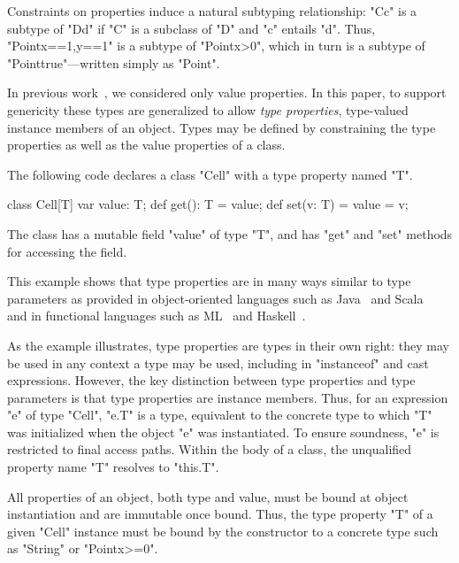 
Constraints on properties induce a natural subtyping relationship:
\xcd"C{c}" is a subtype of
\xcd"D{d}" if \xcd"C" is a subclass of \xcd"D" and
\xcd"c" entails \xcd"d".  Thus, \xcd"Point{x==1,y==1}"
is a subtype of \xcd"Point{x>0}", which in turn is a subtype of
\xcd"Point{true}"---written simply as \xcd"Point".

In previous
work~\cite{X10,constrained-types}, we considered
only value properties.
In this paper,
to support genericity these types are generalized
to allow \emph{type properties}, type-valued instance
members of an object.
Types may be defined by constraining the type properties as
well as the value properties of a class.

The following code declares a class \xcd"Cell" with a type
property named \xcd"T".
\begin{xten}
class Cell[T] {
    var value: T;
    def get(): T = value;
    def set(v: T) = { value = v; }
}
\end{xten}
The class has a mutable field \xcd"value" of type \xcd"T",
and has \xcd"get" and \xcd"set" methods for accessing the field.

This example shows that type properties are in many ways similar to
type parameters as provided in object-oriented languages such as
Java~\cite{Java3} and Scala~\cite{scala} and in functional
languages such as ML~\cite{ml} and
Haskell~\cite{haskell}.

As the example illustrates,
type properties are types in their own right:
they may be used in any context a type may be used,
including in \xcd"instanceof" and cast expressions.
%
However, the key distinction between type properties
and type parameters is that type properties are instance
members.
Thus, for an expression \xcd"e" of type \xcd"Cell", \xcd"e.T" is
a type, equivalent to the concrete type to which \xcd"T" was
initialized when the object \xcd"e" was instantiated.
To ensure
soundness, \xcd"e" is restricted to final access paths.
Within the body of a class, the unqualified property name \xcd"T" resolves
to \xcd"this.T".

All properties of an object, both type and value, must be bound at object
instantiation and are immutable once bound.  Thus, the type
property \xcd"T" of a given \xcd"Cell" instance must be bound
by the constructor
to a concrete type such as \xcd"String" or \xcd"Point{x>=0}".

